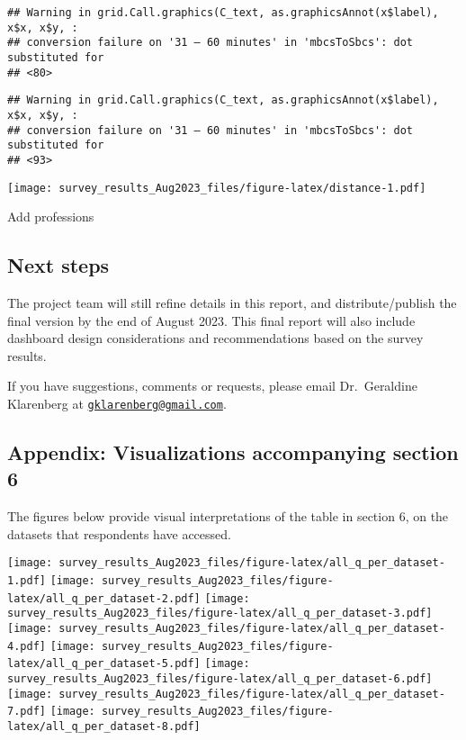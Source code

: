 \documentclass[
]{article}
\begin{document}
\begin{verbatim}
## Warning in grid.Call.graphics(C_text, as.graphicsAnnot(x$label), x$x, x$y, :
## conversion failure on '31 – 60 minutes' in 'mbcsToSbcs': dot substituted for
## <80>
\end{verbatim}

\begin{verbatim}
## Warning in grid.Call.graphics(C_text, as.graphicsAnnot(x$label), x$x, x$y, :
## conversion failure on '31 – 60 minutes' in 'mbcsToSbcs': dot substituted for
## <93>
\end{verbatim}

\texttt{[image: survey\_results\_Aug2023\_files/figure-latex/distance-1.pdf]}

Add professions

\hypertarget{next-steps}{%
\subsection{Next steps}\label{next-steps}}

The project team will still refine details in this report, and
distribute/publish the final version by the end of August 2023. This
final report will also include dashboard design considerations and
recommendations based on the survey results.

If you have suggestions, comments or requests, please email
Dr.~Geraldine Klarenberg at
\href{mailto:gklarenberg@gmail.com}{\nolinkurl{gklarenberg@gmail.com}}.

\hypertarget{appendix-visualizations-accompanying-section-6}{%
\subsection{Appendix: Visualizations accompanying section
6}\label{appendix-visualizations-accompanying-section-6}}

The figures below provide visual interpretations of the table in section
6, on the datasets that respondents have accessed.

\texttt{[image: survey\_results\_Aug2023\_files/figure-latex/all\_q\_per\_dataset-1.pdf]}
\texttt{[image: survey\_results\_Aug2023\_files/figure-latex/all\_q\_per\_dataset-2.pdf]}
\texttt{[image: survey\_results\_Aug2023\_files/figure-latex/all\_q\_per\_dataset-3.pdf]}
\texttt{[image: survey\_results\_Aug2023\_files/figure-latex/all\_q\_per\_dataset-4.pdf]}
\texttt{[image: survey\_results\_Aug2023\_files/figure-latex/all\_q\_per\_dataset-5.pdf]}
\texttt{[image: survey\_results\_Aug2023\_files/figure-latex/all\_q\_per\_dataset-6.pdf]}
\texttt{[image: survey\_results\_Aug2023\_files/figure-latex/all\_q\_per\_dataset-7.pdf]}
\texttt{[image: survey\_results\_Aug2023\_files/figure-latex/all\_q\_per\_dataset-8.pdf]}
\end{document}
